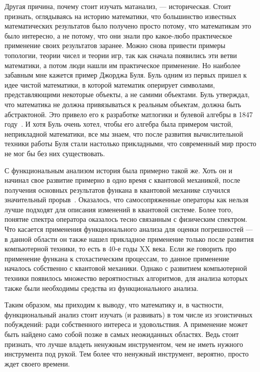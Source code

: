 \documentclass[russian]{article}
\begin{document}
Другая причина, почему стоит изучать матанализ, --- историческая. Стоит признать, оглядываясь на историю математики, что большинство известных математических результатов было получено просто потому, что математикам это было интересно, а не потому, что они знали про какое-любо практическое применение своих результатов заранее. Можно снова привести примеры топологии, теории чисел и теории игр, так как сначала появились эти ветви математики, а потом люди нашли им практическое применение. Но наиболее забавным мне кажется пример Джорджа Буля. Буль одним из первых пришел к идее чистой математики, в которой математик оперирует символами, представляющими некоторые объекты, а не самими объектами. Буль утверждал, что математика не должна привязываться к реальным объектам, должна быть абстрактоной. Это привело его к разработке матлогики и булевой алгебры в 1847 году~\cite{boole}. И хотя Буль очень хотел, чтобы его алгебра была примером чистой, неприкладной математики, все мы знаем, что после развития вычислительной техники работы Буля стали настолько прикладными, что современный мир просто не мог бы без них существовать.

С функциональным анализом история была примерно такой же. Хоть он и начинал свое развитие примерно в одно время с квантовой механикой, после получения основных результатов функана в квантовой механике случился значительный прорыв~\cite{quantum}. Оказалось, что самосопряженные операторы как нельзя лучше подходят для описания изменений в квантовой системе. Более того, понятие спектра оператора оказалось тесно связанным с физическим спектром.
Что касается применения функционального анализа для оценки погрешностей --- в данной области он также нашел прикладное применение только после развития компьютерной техники, то есть в 40-е годы XX века. Если же говорить про применение функана к стохастическим процессам, то данное применение началось собственно с квантовой механики. Однако с развитием компьютерной техники появилось множество вероятностных алгоритмов, для анализа которых также были необходимы средства из функционального анализа.

Таким образом, мы приходим к выводу, что математику и, в частности, функциональный анализ стоит изучать (и развивать) в том числе из эгоистичных побуждений: ради собственного интереса и удовольствия. А применение может быть найдено само собой позже в самых неожиданных областях. Ведь стоит признать, что лучше владеть ненужным инструментом, чем не иметь нужного инструмента под рукой. Тем более что ненужный инструмент, вероятно, просто ждет своего времени.
\end{document}
